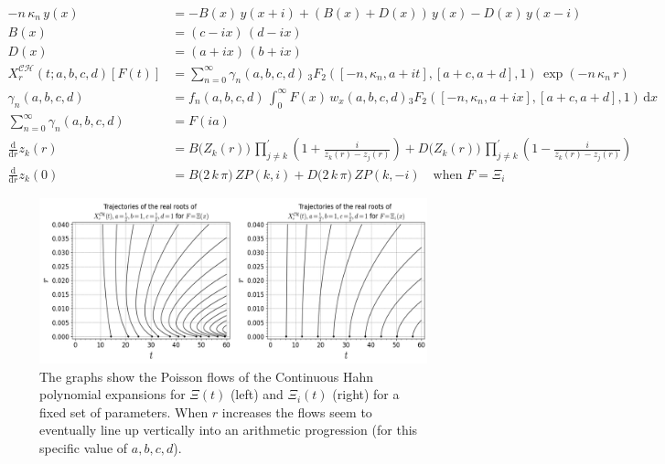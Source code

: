 \documentclass[a4paper,11pt,twoside]{amsart}
\newcommand{\verifiedeq}{=}
\newcommand{\verifiedeq}{\stackrel{\checkmark}{=}}
\begin{document}
\begin{small}
{\begin{minipage}{\textwidth}
\begin{align}
 -n\,\kappa_n\,y(x) &\verifiedeq -B(x)\,y(x+i)+\left(B(x)+D(x)\right)\,y(x)-D(x)\,y(x-i) \\
  B(x)&\verifiedeq (c-ix)\,(d-ix) \\
  D(x)&\verifiedeq (a+ix)\,(b+ix) \\
  X^\mathcal{CH}_r(t;a,b,c,d)\left[F(t)\right] &\verifiedeq \sum_{n=0}^\infty \gamma_n(a,b,c,d)\,{}_3F_2\left([-n, \kappa_n, a+it],[a+c,a+d],1\right)\,\exp\left(-n\,\kappa_n\,r\right) \\ 
  \gamma_n(a,b,c,d) &\verifiedeq f_n(a,b,c,d)\,\int_{0}^{\infty} F(x)\,w_x(a,b,c,d) {}_3F_2\left([-n, \kappa_n, a+ix],[a+c,a+d],1\right)\,\mathrm{d}x \\
  \sum_{n=0}^\infty \gamma_n(a,b,c,d) &= F(ia) \\
  \frac{\mathrm{d}}{\mathrm{d} r} z_k(r)&\verifiedeq B\big(Z_k(r)\big)\,\prod_{j \ne k}^{'} \left(1+\frac{i}{z_k(r)-z_j(r)}\right)+D\big(Z_k(r)\big)\,\prod_{j \ne k}^{'} \left(1-\frac{i}{z_k(r)-z_j(r)}\right) \label{zerodiffch} \\
  \frac{\mathrm{d}}{\mathrm{d} r} z_k(0)&\verifiedeq B\big(2\,k\,\pi\big)\,ZP(k,i)+D\big(2\,k\,\pi)\,ZP(k,-i)\quad \text{when } F=\Xi_i 
\end{align}
\end{minipage}}
\begin{figure}[H]
  \includegraphics[width=1\linewidth]{ContHahnFlowdouble.jpeg}
  \caption{The graphs show the Poisson flows of the Continuous Hahn polynomial expansions for $\Xi(t)$ (left) and $\Xi_i(t)$ (right) for a fixed set of parameters. When $r$ increases the flows seem to eventually line up vertically into an arithmetic progression (for this specific value of $a,b,c,d$).}
  \label{fig:flowCH}
\end{figure}
\pagebreak
\noindent{}
\end{small}
\end{document}
